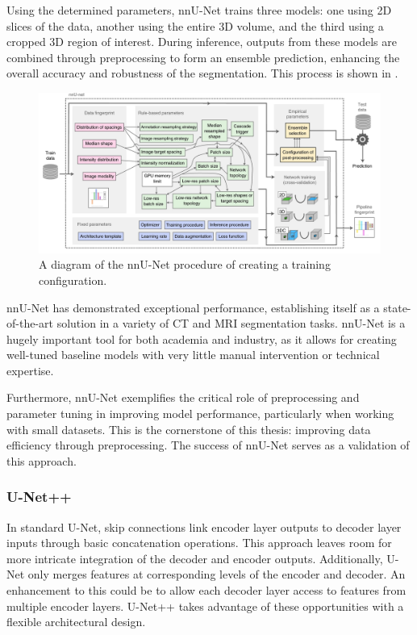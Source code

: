 Using the determined parameters, nnU-Net trains three models: one using 2D slices of the data, another using the entire 3D volume, and the third using a cropped 3D region of interest. During inference, outputs from these models are combined through preprocessing to form an ensemble prediction, enhancing the overall accuracy and robustness of the segmentation. This process is shown in .

\begin{figure}[h!]
 \centering
 \includegraphics[width=\linewidth]{images/nnunet-arch}
 \caption{A diagram of the nnU-Net procedure of creating a training configuration. \cite{isenseeNnUNetSelfconfiguringMethod2021}}
 \label{fig:nnunet-arch}
 \end{figure}
 
 nnU-Net has demonstrated exceptional performance, establishing itself as a state-of-the-art solution in a variety of CT and MRI segmentation tasks. nnU-Net is a hugely important tool for both academia and industry, as it allows for creating well-tuned baseline models with very little manual intervention or technical expertise.
 
 Furthermore, nnU-Net exemplifies the critical role of preprocessing and parameter tuning in improving model performance, particularly when working with small datasets. This is the cornerstone of this thesis: improving data efficiency through preprocessing. The success of nnU-Net serves as a validation of this approach.
 
 \subsubsection{U-Net++}
 
In standard U-Net, skip connections link encoder layer outputs to decoder layer inputs through basic concatenation operations. This approach leaves room for more intricate integration of the decoder and encoder outputs. Additionally, U-Net only merges features at corresponding levels of the encoder and decoder. An enhancement to this could be to allow each decoder layer access to features from multiple encoder layers. U-Net++ \cite{zhou2019unetplusplus} takes advantage of these opportunities with a flexible architectural design.

